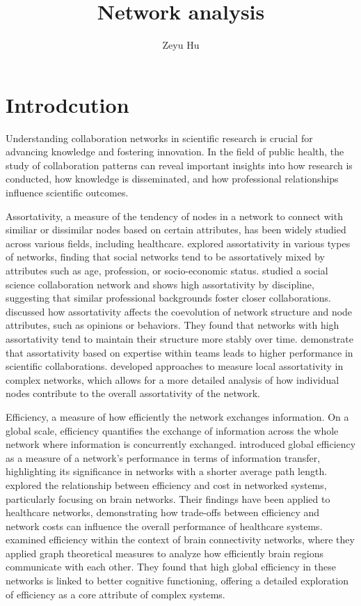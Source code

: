 \documentclass[12pt]{article}
\title{Network analysis}
\author{Zeyu Hu\\
}
\begin{document}
\maketitle

\doublespacing

\section{Introdcution}
Understanding collaboration networks in scientific research is crucial for advancing knowledge and fostering innovation. In the field of public health, the study of collaboration patterns can reveal important insights into how research is conducted, how knowledge is disseminated, and how professional relationships influence scientific outcomes. 

Assortativity, a measure of the tendency of nodes in a network to connect with similiar or dissimilar nodes based on certain attributes, has been widely studied across various fields, including healthcare. \citep{newman2002assortative} explored assortativity in various types of networks, finding that social networks tend to be assortatively mixed by attributes such as age, profession, or socio-economic status. \citep{moody2004structure} studied a social science collaboration network and shows high assortativity by discipline, suggesting that similar professional backgrounds foster closer collaborations. \citep{holme2006nonequilibrium} discussed how assortativity affects the coevolution of network structure and node attributes, such as opinions or behaviors. They found that networks with high assortativity tend to maintain their structure more stably over time. \citep{guimera2005team} demonstrate that assortativity based on expertise within teams leads to higher performance in scientific collaborations. \citep{piraveenan2010assortative} developed approaches to measure local assortativity in complex networks, which allows for a more detailed analysis of how individual nodes contribute to the overall assortativity of the network.

Efficiency, a measure of how efficiently the network exchanges information. On a global scale, efficiency quantifies the exchange of information across the whole network where information is concurrently exchanged. \citep{latora2001efficient} introduced global efficiency as a measure of a network’s performance in terms of information transfer, highlighting its significance in networks with a shorter average path length. \citep{achard2007efficiency} explored the relationship between efficiency and cost in networked systems, particularly focusing on brain networks. Their findings have been applied to healthcare networks, demonstrating how trade-offs between efficiency and network costs can influence the overall performance of healthcare systems. \citep{bullmore2009complex} examined efficiency within the context of brain connectivity networks, where they applied graph theoretical measures to analyze how efficiently brain regions communicate with each other. They found that high global efficiency in these networks is linked to better cognitive functioning, offering a detailed exploration of efficiency as a core attribute of complex systems.
\end{document}
